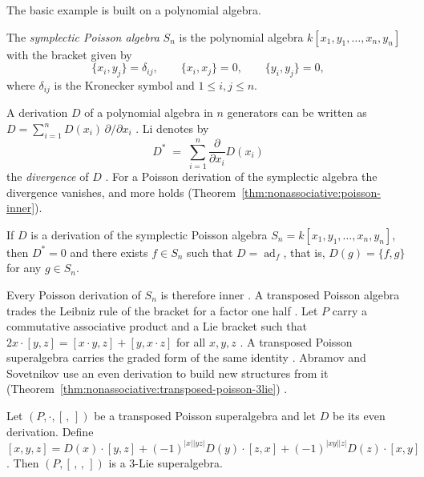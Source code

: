 The basic example is built on a polynomial algebra.

\begin{example}
\label{ex:nonassociative:symplectic}
The \emph{symplectic Poisson algebra} $S_n$ is the polynomial algebra
$k[x_1,y_1,\dots,x_n,y_n]$ with the bracket given by
\[
\{x_i,y_j\}=\delta_{ij},\qquad \{x_i,x_j\}=0,\qquad \{y_i,y_j\}=0,
\]
where $\delta_{ij}$ is the Kronecker symbol and $1\le i,j\le n$.
\end{example}

A derivation $D$ of a polynomial algebra in $n$ generators can be written
as $D=\sum_{i=1}^{n}D(x_i)\,\partial/\partial x_i$
\cite[p.~658]{AlbertiArestiLi2018Poisson}. Li denotes by
\[
D^{\ast}\;=\;\sum_{i=1}^{n}\frac{\partial}{\partial x_i}D(x_i)
\]
the \emph{divergence} of $D$ \cite[p.~658]{AlbertiArestiLi2018Poisson}.
For a
Poisson derivation of the symplectic algebra the divergence vanishes, and
more holds (Theorem~\ref{thm:nonassociative:poisson-inner}).

\begin{theorem}
\label{thm:nonassociative:poisson-inner}
If $D$ is a derivation of the symplectic Poisson algebra
$S_n=k[x_1,y_1,\dots,x_n,y_n]$, then $D^{\ast}=0$ and there exists
$f\in S_n$ such that $D=\operatorname{ad}_f$, that is, $D(g)=\{f,g\}$ for
any $g\in S_n$.
\end{theorem}

Every Poisson derivation of $S_n$ is therefore inner \cite[equation~(12),
p.~489]{AbramovSovetnikov2025}. A transposed Poisson algebra trades the
Leibniz rule of the bracket for a factor one half \cite[equation~(12),
p.~489]{AbramovSovetnikov2025}. Let $P$ carry a commutative associative
product and a Lie bracket such that $2x\cdot[y,z]=[x\cdot y,z]+[y,x\cdot z]$
for all $x,y,z$ \cite[equation~(12), p.~489]{AbramovSovetnikov2025}. A
transposed Poisson superalgebra carries the graded form of the same identity
\cite[Definition~2.1, p.~490]{AbramovSovetnikov2025}. Abramov and Sovetnikov
use an even derivation to build new structures from it
(Theorem~\ref{thm:nonassociative:transposed-poisson-3lie})
\cite[p.~487]{AbramovSovetnikov2025}.\begin{theorem}\label{thm:nonassociative:transposed-poisson-3lie}
Let $(P,\cdot,[\,,\,])$ be a transposed Poisson superalgebra and let $D$ be
its even derivation. Define
$[x,y,z]=D(x)\cdot[y,z]+(-1)^{|x||yz|}D(y)\cdot[z,x]+(-1)^{|xy||z|}D(z)\cdot[x,y]$.
Then $(P,[\,,\,,\,])$ is a 3-Lie superalgebra. \end{theorem}

